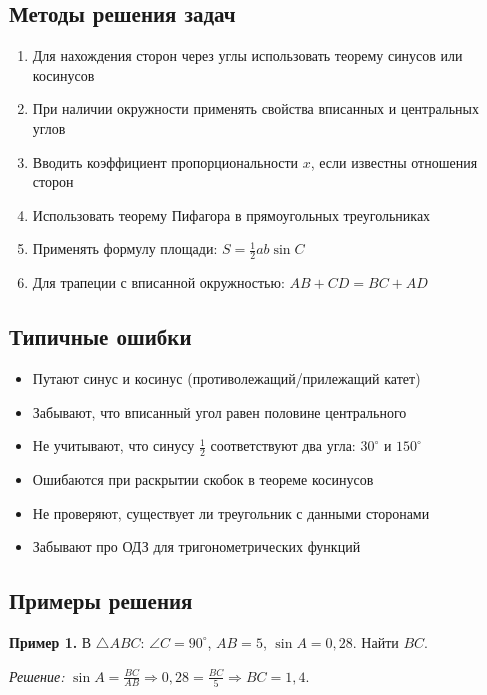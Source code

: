\documentclass[a4paper,12pt]{article}
\begin{document}
\subsection*{Методы решения задач}
\begin{enumerate}[label=\arabic*., leftmargin=*]
    \item Для нахождения сторон через углы использовать теорему синусов или косинусов
    \item При наличии окружности применять свойства вписанных и центральных углов
    \item Вводить коэффициент пропорциональности $x$, если известны отношения сторон
    \item Использовать теорему Пифагора в прямоугольных треугольниках
    \item Применять формулу площади: $S = \frac{1}{2}ab\sin C$
    \item Для трапеции с вписанной окружностью: $AB + CD = BC + AD$
\end{enumerate}

\subsection*{Типичные ошибки}
\begin{itemize}[label=\textcolor{accent}{\textbullet}, leftmargin=*]
    \item Путают синус и косинус (противолежащий/прилежащий катет)
    \item Забывают, что вписанный угол равен половине центрального
    \item Не учитывают, что синусу $\frac{1}{2}$ соответствуют два угла: $30^\circ$ и $150^\circ$
    \item Ошибаются при раскрытии скобок в теореме косинусов
    \item Не проверяют, существует ли треугольник с данными сторонами
    \item Забывают про ОДЗ для тригонометрических функций
\end{itemize}

\subsection*{Примеры решения}

\textbf{Пример 1.} В $\triangle ABC$: $\angle C = 90^\circ$, $AB = 5$, $\sin A = 0{,}28$. Найти $BC$.

\textit{Решение:} $\sin A = \frac{BC}{AB} \Rightarrow 0{,}28 = \frac{BC}{5} \Rightarrow BC = 1{,}4$.
\end{document}
